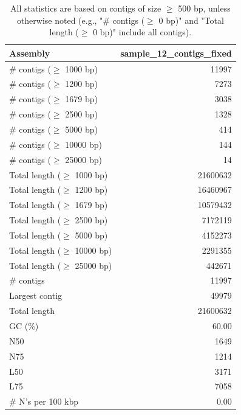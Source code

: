 \documentclass[12pt,a4paper]{article}
\begin{document}
\begin{table}[ht]
\begin{center}
\caption{All statistics are based on contigs of size $\geq$ 500 bp, unless otherwise noted (e.g., "\# contigs ($\geq$ 0 bp)" and "Total length ($\geq$ 0 bp)" include all contigs).}
\begin{tabular}{|l*{1}{|r}|}
\hline
Assembly & sample\_12\_contigs\_fixed \\ \hline
\# contigs ($\geq$ 1000 bp) & 11997 \\ \hline
\# contigs ($\geq$ 1200 bp) & 7273 \\ \hline
\# contigs ($\geq$ 1679 bp) & 3038 \\ \hline
\# contigs ($\geq$ 2500 bp) & 1328 \\ \hline
\# contigs ($\geq$ 5000 bp) & 414 \\ \hline
\# contigs ($\geq$ 10000 bp) & 144 \\ \hline
\# contigs ($\geq$ 25000 bp) & 14 \\ \hline
Total length ($\geq$ 1000 bp) & 21600632 \\ \hline
Total length ($\geq$ 1200 bp) & 16460967 \\ \hline
Total length ($\geq$ 1679 bp) & 10579432 \\ \hline
Total length ($\geq$ 2500 bp) & 7172119 \\ \hline
Total length ($\geq$ 5000 bp) & 4152273 \\ \hline
Total length ($\geq$ 10000 bp) & 2291355 \\ \hline
Total length ($\geq$ 25000 bp) & 442671 \\ \hline
\# contigs & 11997 \\ \hline
Largest contig & 49979 \\ \hline
Total length & 21600632 \\ \hline
GC (\%) & 60.00 \\ \hline
N50 & 1649 \\ \hline
N75 & 1214 \\ \hline
L50 & 3171 \\ \hline
L75 & 7058 \\ \hline
\# N's per 100 kbp & 0.00 \\ \hline
\end{tabular}
\end{center}
\end{table}
\end{document}
